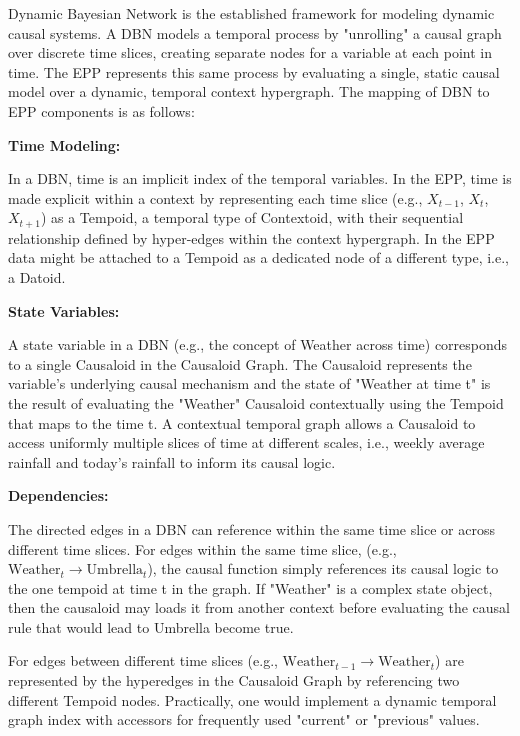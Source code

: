 Dynamic Bayesian Network is the established framework for modeling dynamic causal systems. A DBN models a temporal process by "unrolling" a causal graph over discrete time slices, creating separate nodes for a variable at each point in time. The EPP represents this same process   by evaluating a single, static causal model over a dynamic, temporal context hypergraph. The mapping of DBN to EPP components is as follows:
 
 \textbf{Time Modeling:}
 
 In a DBN, time is an implicit index of the temporal variables. In the EPP, time is made explicit within a
 context by representing each time slice (e.g., $X_{t-1}$, $X_t$, $X_{t+1}$) as a Tempoid, a temporal type of Contextoid, with their sequential relationship defined by hyper-edges within the context hypergraph. In the EPP data might be attached to a Tempoid as a dedicated node of a different type, i.e., a Datoid. 

 \textbf{State Variables:}
 
A state variable in a DBN (e.g., the concept of Weather across time) corresponds to a single Causaloid in the Causaloid Graph. The Causaloid represents the variable's underlying causal mechanism and the state of "Weather at time t" is the result of evaluating the "Weather" Causaloid contextually using the Tempoid that maps to the time t. A contextual temporal graph allows a Causaloid to access uniformly multiple slices of time at different scales, i.e., weekly average rainfall and today's rainfall to inform its causal logic. 

\textbf{Dependencies:}

The directed edges in a DBN can reference within the same time slice or across different time slices.
For edges within the same time slice, (e.g., $\text{Weather}_t \to \text{Umbrella}_t$), the causal function simply references its causal logic to the one tempoid at time t in the graph. If "Weather" is a complex state object, then the causaloid may loads it from another context before evaluating the causal rule that would lead to Umbrella become true.

For edges between different time slices (e.g., $\text{Weather}_{t-1} \to \text{Weather}_t$) are represented by the hyperedges in the Causaloid Graph by referencing two different Tempoid nodes. Practically, one would implement a dynamic temporal graph index with accessors for frequently used "current" or "previous" values. \newline


